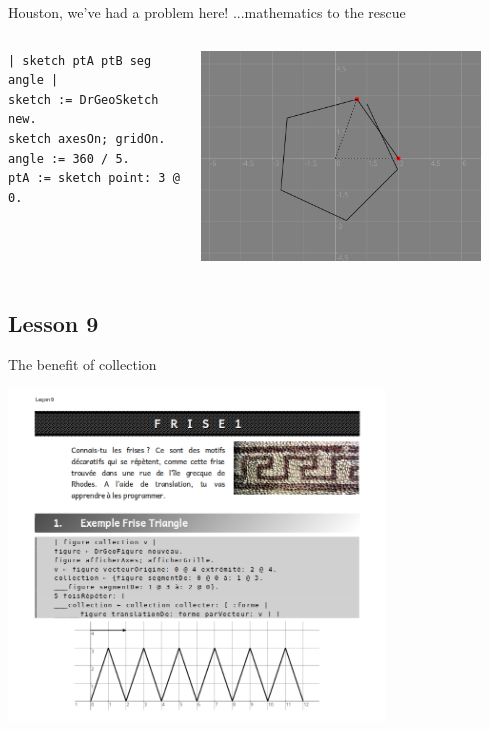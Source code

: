 \documentclass{beamer}
\begin{document}
%
\begin{frame}[fragile]{Houston, we've had a problem here!}
  ...mathematics to the rescue
  \begin{columns}[c]
    \begin{column}{0.5\textwidth}
      \fontsize{10pt}{0pt}\selectfont
      \begin{lstlisting}[language=Smalltalk]
| sketch ptA ptB seg angle |
sketch := DrGeoSketch new.
sketch axesOn; gridOn.
angle := 360 / 5.
ptA := sketch point: 3 @ 0.        
      \end{lstlisting}
    \end{column}
  \begin{column}{0.5\textwidth}
      \includegraphics[width=0.9\textwidth]{pentagone.png}
  \end{column}  
\end{columns}
\end{frame}

\subsection{Lesson 9}
\begin{frame}{The benefit of collection}
  \begin{center}
  \includegraphics[width=0.75\textwidth]{Frise1a.png}
\end{center}
\end{frame}
\end{document}
